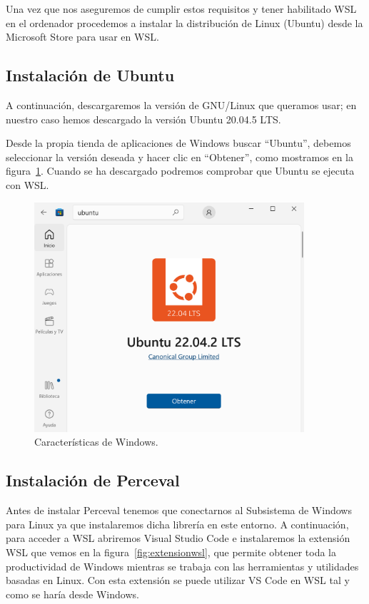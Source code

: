 \documentclass[a4paper, 12pt]{book}
\begin{document}
Una vez que nos aseguremos de cumplir estos requisitos y tener habilitado WSL en el ordenador procedemos a instalar la distribución de Linux (Ubuntu) desde la Microsoft Store para usar en WSL. 

\subsection{Instalación de Ubuntu} %
\label{sec:instalación de ubuntu}

A continuación, descargaremos la versión de GNU/Linux que queramos usar; en nuestro caso hemos descargado la versión Ubuntu 20.04.5 LTS.


Desde la propia tienda de aplicaciones de Windows buscar ``Ubuntu'', debemos seleccionar la versión deseada y hacer clic en ``Obtener'', como mostramos en la figura~\ref{fig:ubuntu}.
Cuando se ha descargado podremos comprobar que Ubuntu se ejecuta con WSL.

\begin{figure}
  \centering
  \includegraphics[width=10cm, keepaspectratio]{img/Ubuntu.PNG}
  \caption{Características de Windows.}\label{fig:ubuntu}
\end{figure}

\subsection{Instalación de Perceval} %
\label{sec:instalación de perceval}

Antes de instalar Perceval tenemos que conectarnos al Subsistema de Windows para Linux ya que instalaremos dicha librería en este entorno.
A continuación, para acceder a WSL abriremos Visual Studio Code e instalaremos la extensión WSL que vemos en la figura~\ref{fig:extensionwsl}, que permite obtener toda la productividad de Windows mientras se trabaja con las herramientas y utilidades basadas en Linux.
Con esta extensión se puede utilizar VS Code en WSL tal y como se haría desde Windows.
\end{document}
